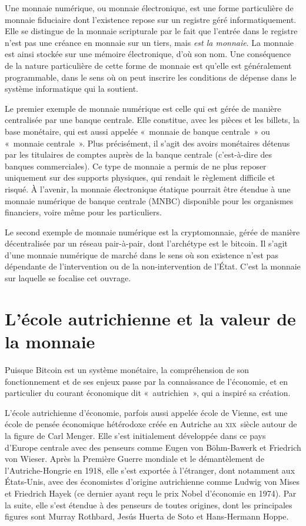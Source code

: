 
Une monnaie numérique, ou monnaie électronique, est une forme particulière de monnaie fiduciaire dont l'existence repose sur un registre géré informatiquement. Elle se distingue de la monnaie scripturale par le fait que l'entrée dans le registre n'est pas une créance en monnaie sur un tiers, mais \emph{est la monnaie}. La monnaie est ainsi stockée sur une mémoire électronique, d'où son nom. Une conséquence de la nature particulière de cette forme de monnaie est qu'elle est généralement programmable, dans le sens où on peut inscrire les conditions de dépense dans le système informatique qui la soutient.

Le premier exemple de monnaie numérique est celle qui est gérée de manière centralisée par une banque centrale. Elle constitue, avec les pièces et les billets, la base monétaire, qui est aussi appelée «~monnaie de banque centrale~» ou «~monnaie centrale~». Plus précisément, il s'agit des avoirs monétaires détenus par les titulaires de comptes auprès de la banque centrale (c'est-à-dire des banques commerciales). Ce type de monnaie a permis de ne plus reposer uniquement sur des supports physiques, qui rendait le règlement difficile et risqué. À l'avenir, la monnaie électronique étatique pourrait être étendue à une monnaie numérique de banque centrale (MNBC) disponible pour les organismes financiers, voire même pour les particuliers. %

Le second exemple de monnaie numérique est la cryptomonnaie, gérée de manière décentralisée par un réseau pair-à-pair, dont l'archétype est le bitcoin. Il s'agit d'une monnaie numérique de marché dans le sens où son existence n'est pas dépendante de l'intervention ou de la non-intervention de l'État. C'est la monnaie sur laquelle se focalise cet ouvrage.

\section*{L'école autrichienne et la valeur de la monnaie}

Puisque Bitcoin est un système monétaire, la compréhension de son fonctionnement et de ses enjeux passe par la connaissance de l'économie, et en particulier du courant économique dit «~autrichien~», qui a inspiré sa création. 

L'école autrichienne d'économie, parfois aussi appelée école de Vienne, est une école de pensée économique hétérodoxe créée en Autriche au \textsc{xix}\ieme{}~siècle autour de la figure de Carl Menger. Elle s'est initialement développée dans ce pays d'Europe centrale avec des penseurs comme Eugen von Böhm-Bawerk et Friedrich von Wieser. Après la Première Guerre mondiale et le démantèlement de l'Autriche-Hongrie en 1918, elle s'est exportée à l'étranger, dont notamment aux États-Unis, avec des économistes d'origine autrichienne comme Ludwig von Mises et Friedrich Hayek (ce dernier ayant reçu le prix Nobel d'économie en 1974). Par la suite, elle s'est étendue à des penseurs de toutes origines, dont les principales figures sont Murray Rothbard, Jesús Huerta de Soto et Hans-Hermann Hoppe.

